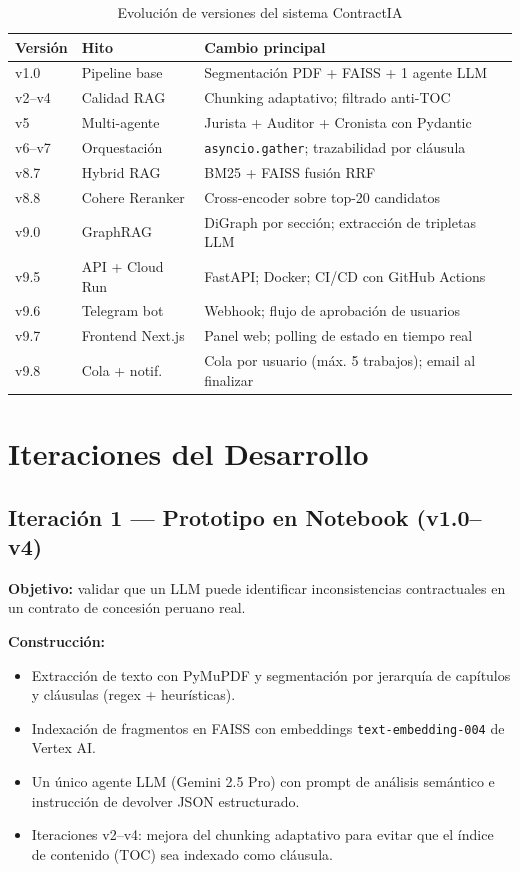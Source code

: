 \begin{table}[H]
\centering
\caption{Evolución de versiones del sistema ContractIA}
\label{tab:versiones}
\begin{tabular}{p{2cm} p{3.5cm} p{7cm}}
\toprule
\textbf{Versión} & \textbf{Hito} & \textbf{Cambio principal} \\
\midrule
v1.0  & Pipeline base      & Segmentación PDF + FAISS + 1 agente LLM \\
v2--v4 & Calidad RAG       & Chunking adaptativo; filtrado anti-TOC \\
v5    & Multi-agente       & Jurista + Auditor + Cronista con Pydantic \\
v6--v7 & Orquestación      & \texttt{asyncio.gather}; trazabilidad por cláusula \\
v8.7  & Hybrid RAG         & BM25 + FAISS fusión RRF \\
v8.8  & Cohere Reranker    & Cross-encoder sobre top-20 candidatos \\
v9.0  & GraphRAG           & DiGraph por sección; extracción de tripletas LLM \\
v9.5  & API + Cloud Run    & FastAPI; Docker; CI/CD con GitHub Actions \\
v9.6  & Telegram bot       & Webhook; flujo de aprobación de usuarios \\
v9.7  & Frontend Next.js   & Panel web; polling de estado en tiempo real \\
v9.8  & Cola + notif.      & Cola por usuario (máx. 5 trabajos); email al finalizar \\
\bottomrule
\end{tabular}
\end{table}

\section{Iteraciones del Desarrollo}

\subsection{Iteración 1 — Prototipo en Notebook (v1.0--v4)}

\textbf{Objetivo:} validar que un LLM puede identificar inconsistencias
contractuales en un contrato de concesión peruano real.

\textbf{Construcción:}
\begin{itemize}
    \item Extracción de texto con PyMuPDF y segmentación por jerarquía
    de capítulos y cláusulas (regex + heurísticas).
    \item Indexación de fragmentos en FAISS con embeddings
    \texttt{text-embedding-004} de Vertex AI.
    \item Un único agente LLM (Gemini 2.5 Pro) con prompt de análisis
    semántico e instrucción de devolver JSON estructurado.
    \item Iteraciones v2--v4: mejora del chunking adaptativo para evitar
    que el índice de contenido (TOC) sea indexado como cláusula.
\end{itemize}

